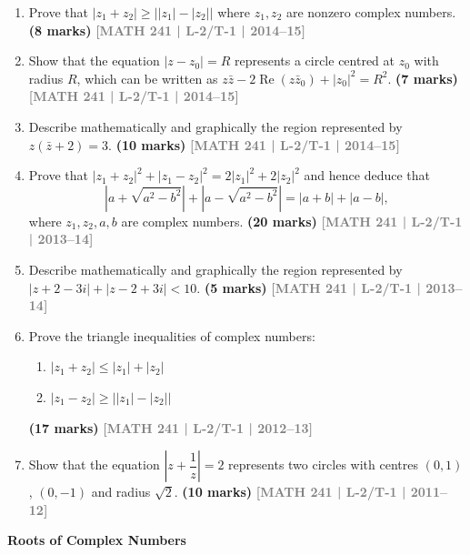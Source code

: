 \documentclass[12pt,a4paper]{article}
\newcommand{\yr}[1]{\hfill\textcolor{gray}{\small\textbf{[#1]}}}
\newcommand{\mk}[1]{\textcolor{orange!70!black}{\small\textbf{(#1 marks)}}}
\newcommand{\subtopic}[2]{%
  \vspace{10pt}
  \noindent\begin{tcolorbox}[colback=#1!8,colframe=#1,boxrule=0.6pt,arc=4pt,
    left=6pt,right=6pt,top=4pt,bottom=4pt]
    \small\bfseries\textcolor{#1}{#2}
  \end{tcolorbox}
  \vspace{2pt}
}
\begin{document}
\begin{enumerate}
\item Prove that $|z_{1}+z_{2}| \ge \bigl||z_{1}|-|z_{2}|\bigr|$ where $z_{1},z_{2}$ are nonzero complex numbers.
\mk{8} \yr{MATH 241 | L-2/T-1 | 2014--15}

\item Show that the equation $|z-z_{0}|=R$ represents a circle centred at $z_{0}$ with radius $R$, which can be written as $z\bar{z}-2\operatorname{Re}(z\bar{z}_{0})+|z_{0}|^{2}=R^{2}$.
\mk{7} \yr{MATH 241 | L-2/T-1 | 2014--15}

\item Describe mathematically and graphically the region represented by $z(\bar{z}+2)=3$.
\mk{10} \yr{MATH 241 | L-2/T-1 | 2014--15}

\item Prove that $|z_{1}+z_{2}|^{2}+|z_{1}-z_{2}|^{2}=2|z_{1}|^{2}+2|z_{2}|^{2}$ and hence deduce that
\[
\left|a+\sqrt{a^{2}-b^{2}}\right|+\left|a-\sqrt{a^{2}-b^{2}}\right|=|a+b|+|a-b|,
\]
where $z_{1},z_{2},a,b$ are complex numbers.
\mk{20} \yr{MATH 241 | L-2/T-1 | 2013--14}

\item Describe mathematically and graphically the region represented by $|z+2-3i|+|z-2+3i|<10$.
\mk{5} \yr{MATH 241 | L-2/T-1 | 2013--14}

\item Prove the triangle inequalities of complex numbers:
\begin{enumerate}
  \item $|z_{1}+z_{2}| \le |z_{1}|+|z_{2}|$
  \item $|z_{1}-z_{2}| \ge \bigl||z_{1}|-|z_{2}|\bigr|$
\end{enumerate}
\mk{17} \yr{MATH 241 | L-2/T-1 | 2012--13}

\item Show that the equation $\left|z+\dfrac{1}{z}\right|=2$ represents two circles with centres $(0,1)$, $(0,-1)$ and radius $\sqrt{2}$.
\mk{10} \yr{MATH 241 | L-2/T-1 | 2011--12}

\end{enumerate}

\subtopic{cE}{Roots of Complex Numbers}
\label{sub:s5-roots}
\end{document}
